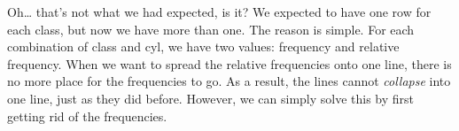 \documentclass[]{tufte-book}
\newenvironment{Shaded}{}{}
\newcommand{\DataTypeTok}[1]{\textcolor[rgb]{0.56,0.13,0.00}{#1}}
\newcommand{\DecValTok}[1]{\textcolor[rgb]{0.25,0.63,0.44}{#1}}
\newcommand{\KeywordTok}[1]{\textcolor[rgb]{0.00,0.44,0.13}{\textbf{#1}}}
\newcommand{\NormalTok}[1]{#1}
\newcommand{\OperatorTok}[1]{\textcolor[rgb]{0.40,0.40,0.40}{#1}}
\newcommand{\StringTok}[1]{\textcolor[rgb]{0.25,0.44,0.63}{#1}}
\begin{document}
Oh\ldots{} that's not what we had expected, is it? We expected to have one row for each class, but now we have more than one. The reason is simple. For each combination of class and cyl, we have two values: frequency and relative frequency. When we want to spread the relative frequencies onto one line, there is no more place for the frequencies to go. As a result, the lines cannot \emph{collapse} into one line, just as they did before. However, we can simply solve this by first getting rid of the frequencies.

\begin{Shaded}
\end{Shaded}
\end{document}
